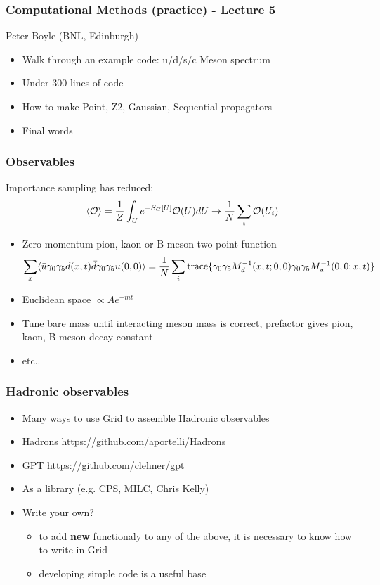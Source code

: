 \documentclass[pdf,ps,8pt]{beamer}
\newcommand{\link}[1]{\href{#1}{ {\color{blue} #1} }}
\begin{document}
\begin{frame}[fragile]\small\frametitle{  Computational Methods (practice) -  Lecture 5    }

  \begin{center}
 
  {\color{red} Peter Boyle} (BNL, Edinburgh)

  \begin{itemize}
  \item Walk through an example code: u/d/s/c Meson spectrum
  \item Under 300 lines of code
  \item How to make Point, Z2, Gaussian, Sequential propagators
  \item Final words
  \end{itemize}

\end{center}  

\end{frame}


\begin{frame}[fragile]\small\frametitle{Observables}

Importance sampling has reduced:
$$
\langle {\cal O} \rangle = \frac{1}{Z} \int_U e^{-S_G[U]} {\cal O}(U) dU  \to \frac{1}{N} \sum\limits_i {\cal O}(U_i) 
$$
\begin{itemize}
\item Zero momentum pion, kaon or B meson two point function
  $$
  \sum\limits_x \langle \bar u \gamma_0 \gamma_5 d (x,t) \bar d \gamma_0 \gamma_5 u (0,0) \rangle
    = \frac{1}{N}\sum_i  {\rm trace}  \{ \gamma_0 \gamma_5 M^{-1}_d(x,t;0,0)\gamma_0 \gamma_5 M^{-1}_u(0,0;x,t) \}
    $$
\item Euclidean space $\propto A e^{- m t} $
\item Tune bare mass until interacting meson mass is correct, prefactor gives pion, kaon, B meson decay constant
\item etc.. 
\end{itemize}
  
\end{frame}

\begin{frame}[fragile]\small\frametitle{ Hadronic observables}
  \begin{itemize}
    \item Many ways to use Grid to assemble Hadronic observables
    \item Hadrons \link{https://github.com/aportelli/Hadrons}
    \item GPT \link{https://github.com/clehner/gpt}
    \item As a library (e.g. CPS, MILC, Chris Kelly)
    \item Write your own?
  \begin{itemize}
  \item to add {\bf new} functionaly to any of the above, it is necessary to know how to write in Grid
  \item developing simple code is a useful base
  \end{itemize}
  \end{itemize}
\end{frame}
\end{document}

